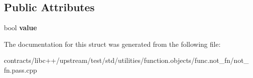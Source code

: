 \subsection*{Public Attributes}
\begin{DoxyCompactItemize}
\item 
\mbox{\label{struct_move_assignable_wrapper_a1ebc646c87226caf6f624f55b57ac4a8}} 
bool {\bfseries value}
\end{DoxyCompactItemize}


The documentation for this struct was generated from the following file\+:\begin{DoxyCompactItemize}
\item 
contracts/libc++/upstream/test/std/utilities/function.\+objects/func.\+not\+\_\+fn/not\+\_\+fn.\+pass.\+cpp\end{DoxyCompactItemize}
